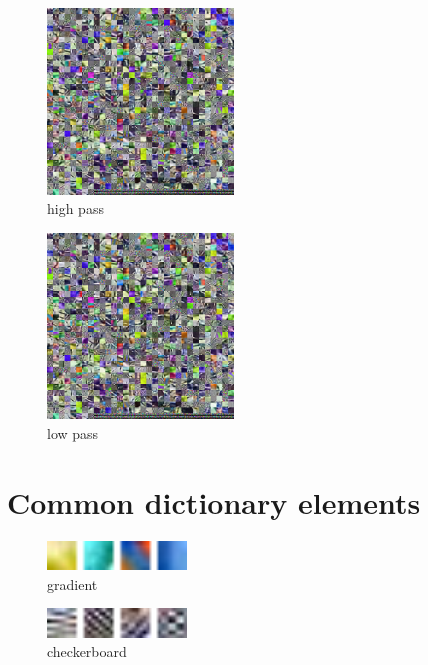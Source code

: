 \begin{figure}
\centering
\includegraphics[width = 0.44\textwidth]{images/16_1000_1000_10_lasso.png}
\caption{high pass}
\label{fig:16_1000_lasso}
\end{figure}

\begin{figure}
\centering
\includegraphics[width = 0.44\textwidth]{images/16_1000_1000_10_lasso.png}
\caption{low pass}
\label{fig:16_1000_lasso}
\end{figure}


\section{Common dictionary elements}

\begin{figure}
\centering
\includegraphics[width = 0.33\textwidth]{images/gradient.png} 
\caption{gradient}
\label{fig:gradient}
\end{figure}

\begin{figure}
\centering
\includegraphics[width = 0.33\textwidth]{images/checkerboard.png}
\caption{checkerboard}
\label{fig:checkerboard}
\end{figure}


